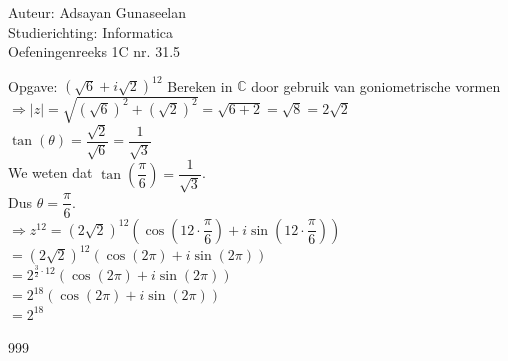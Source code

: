\documentclass[a4paper]{article}
\begin{document}
\noindent \large Auteur: Adsayan Gunaseelan \\
\noindent \large Studierichting: Informatica\\
\noindent \large Oefeningenreeks 1C nr. 31.5\\

\medskip

\normalsize

Opgave: $(\sqrt{6} + i\sqrt{2})^{12}$ Bereken in $\mathbb{C}$ door gebruik van goniometrische vormen\\

$\Rightarrow |z| = \sqrt{(\sqrt{6})^2+(\sqrt{2})^2} = \sqrt{6+2}=\sqrt{8}=2\sqrt{2}$\\

$\tan(\theta) = \dfrac{\sqrt{2}}{\sqrt{6}} = \dfrac{1}{\sqrt{3}}$\\

We weten dat $\tan\left(\dfrac{\pi}{6}\right) = \dfrac{1}{\sqrt{3}}$.\\

Dus $\theta = \dfrac{\pi}{6}$.\\


$\Rightarrow z^{12} = (2\sqrt{2})^{12}(\cos({12\cdot\dfrac{\pi}{6}})+i\sin({12\cdot\dfrac{\pi}{6}}))$\\

$=(2\sqrt{2})^{12}(\cos(2\pi)+i\sin(2\pi))$\\

$ =2^{\tfrac{3}{2}\cdot12}(\cos(2\pi)+i\sin(2\pi))$\\

$ =2^{18}(\cos(2\pi)+i\sin(2\pi))$\\

$ =2^{18}$\\

\begin{thebibliography}{999}
\end{thebibliography}
\end{document}

